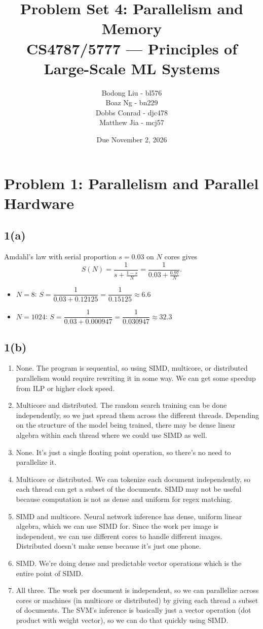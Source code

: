 \documentclass[11pt]{article}
\title{Problem Set 4: Parallelism and Memory \\
  \large CS4787/5777 --- Principles of Large-Scale ML Systems}
\author{
  Bodong Liu - bl576 \\
  Boaz Ng - bn229 \\ 
  Dobbs Conrad - djc478 \\
  Matthew Jia - mcj57
  }
\date{Due November 2, 2026}
\newcommand{\problem}[2]{\section*{Problem #1: #2}}
\newcommand{\probpart}[1]{\subsection*{#1}}
\begin{document}
\maketitle

\problem{1}{Parallelism and Parallel Hardware}

\probpart{1(a)}
Amdahl's law with serial proportion $s = 0.03$ on $N$ cores gives
\[
S(N) = \frac{1}{s + \frac{1-s}{N}} = \frac{1}{0.03 + \frac{0.97}{N}}.
\]
\begin{itemize}
  \item $N = 8$: \quad $S = \dfrac{1}{0.03 + 0.12125} = \dfrac{1}{0.15125} \approx {6.6}$
  \item $N = 1024$: \quad $S = \dfrac{1}{0.03 + 0.000947} = \dfrac{1}{0.030947} \approx {32.3}$
\end{itemize}

\probpart{1(b)}
\begin{enumerate}[label=(\roman*)]
  \item None. The program is sequential, so using SIMD, multicore, or distributed parallelism would require rewriting it in some way. We can get some speedup from ILP or higher clock speed.

  \item Multicore and distributed. The random search training can be done independently, so we just spread them across the different threads. Depending on the structure of the model being trained, there may be dense linear algebra within each thread where we could use SIMD as well.

  \item None. It's just a single floating point operation, so there's no need to parallelize it.

  \item Multicore or distributed. We can tokenize each document independently, so each thread can get a subset of the documents. SIMD may not be useful because computation is not as dense and uniform for regex matching.

  \item SIMD and multicore. Neural network inference has dense, uniform linear algebra, which we can use SIMD for. Since the work per image is independent, we can use different cores to handle different images. Distributed doesn't make sense because it's just one phone.

  \item SIMD. We're doing dense and predictable vector operations which is the entire point of SIMD. 

  \item All three. The work per document is independent, so we can parallelize across cores or machines (in multicore or distributed) by giving each thread a subset of documents. The SVM's inference is basically just a vector operation (dot product with weight vector), so we can do that quickly using SIMD.
\end{enumerate}
\end{document}
